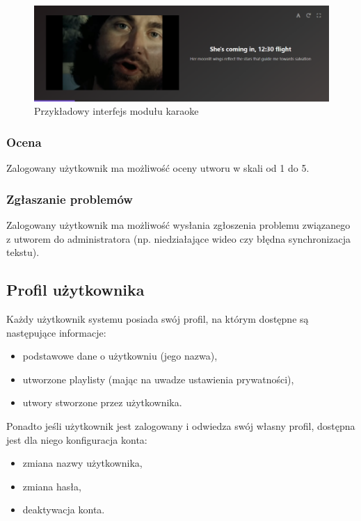 \documentclass[11pt]{article}
\begin{document}
  \begin{figure}[ht]
    \centering
    \includegraphics[width=1.0\textwidth]{sample-karaoke_module.pdf}
    \caption{Przykładowy interfejs modułu karaoke}
  \end{figure}

  \subsubsection{Ocena}
  Zalogowany użytkownik ma możliwość oceny utworu w skali od 1 do 5.

  \subsubsection{Zgłaszanie problemów}
  Zalogowany użytkownik ma możliwość wysłania zgłoszenia problemu związanego z utworem do administratora (np. niedziałające wideo czy błędna synchronizacja tekstu).

  \subsection{Profil użytkownika}
  Każdy użytkownik systemu posiada swój profil, na którym dostępne są następujące informacje:

  \begin{itemize}
    \item podstawowe dane o użytkowniu (jego nazwa),
    \item utworzone playlisty (mając na uwadze ustawienia prywatności),
    \item utwory stworzone przez użytkownika.
  \end{itemize}

  Ponadto jeśli użytkownik jest zalogowany i odwiedza swój własny profil, dostępna jest dla niego konfiguracja konta:

  \begin{itemize}
    \item zmiana nazwy użytkownika,
    \item zmiana hasła,
    \item deaktywacja konta.
  \end{itemize}
\end{document}
